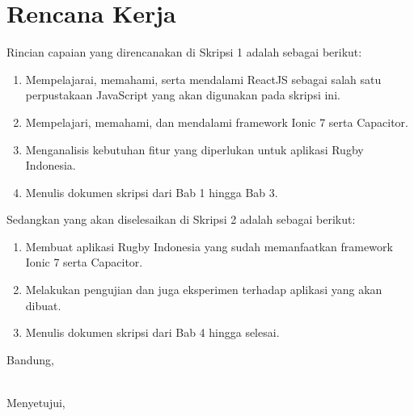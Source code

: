 \documentclass[a4paper,twoside]{article}
\begin{document}
\section{Rencana Kerja}
Rincian capaian yang direncanakan di Skripsi 1 adalah sebagai berikut:
\begin{enumerate}
    \item Mempelajarai, memahami, serta mendalami ReactJS sebagai salah satu perpustakaan JavaScript yang akan digunakan pada skripsi ini.
    \item Mempelajari, memahami, dan mendalami framework Ionic 7 serta Capacitor.
    \item Menganalisis kebutuhan fitur yang diperlukan untuk aplikasi Rugby Indonesia.
    \item Menulis dokumen skripsi dari Bab 1 hingga Bab 3.
\end{enumerate}

Sedangkan yang akan diselesaikan di Skripsi 2 adalah sebagai berikut:
\begin{enumerate}
    \item Membuat aplikasi Rugby Indonesia yang sudah memanfaatkan framework Ionic 7 serta Capacitor.
    \item Melakukan pengujian dan juga eksperimen terhadap aplikasi yang akan dibuat.
    \item Menulis dokumen skripsi dari Bab 4 hingga selesai.
\end{enumerate}

\vspace{1cm}
\centering Bandung, \tanggal\\
\vspace{2cm} \nama \\ 
\vspace{1cm}

Menyetujui, \\
\end{document}
